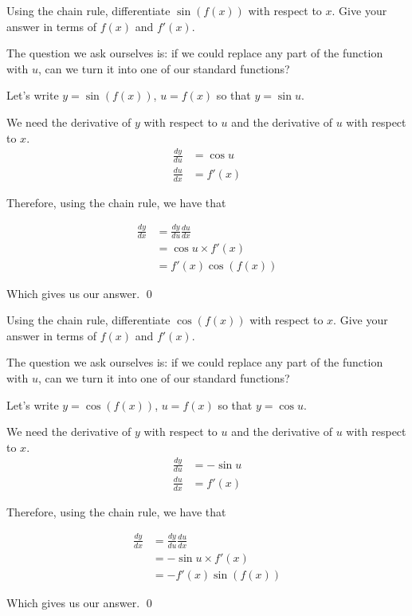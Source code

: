 \begin{example}
    Using the chain rule, differentiate $\sin(f(x))$ with respect to $x$. Give your answer in terms of $f(x)$ and $f'(x)$.
\end{example}
\begin{solution}

    The question we ask ourselves is: if we could replace any part of the function with $u$, can we turn it into one of our standard functions?

    Let's write $y = \sin(f(x))$, $u = f(x)$ so that $y = \sin u$.

    We need the derivative of $y$ with respect to $u$ and the derivative of $u$ with respect to $x$.
    \begin{align*}
        \frac{dy}{du} &= \cos u \tag{using the derivative of $\sin u$} \\
        \frac{du}{dx} &= f'(x) \tag{in terms of $f'(x)$}
    \end{align*}

    Therefore, using the chain rule, we have that 

    \begin{align*}
        \frac{dy}{dx} &= \frac{dy}{du} \frac{du}{dx} \\
         &=  \cos u \times f'(x)  \tag{substituting our workings} \\
         &= f'(x) \cos (f(x)) \tag{using $u = f(x)$}
    \end{align*}

    Which gives us our answer.
    \qed
\end{solution}

\begin{example}
    Using the chain rule, differentiate $\cos(f(x))$ with respect to $x$. Give your answer in terms of $f(x)$ and $f'(x)$.
\end{example}
\begin{solution}

    The question we ask ourselves is: if we could replace any part of the function with $u$, can we turn it into one of our standard functions?

    Let's write $y = \cos(f(x))$, $u = f(x)$ so that $y = \cos u$.

    We need the derivative of $y$ with respect to $u$ and the derivative of $u$ with respect to $x$.
    \begin{align*}
        \frac{dy}{du} &= -\sin u \tag{using the derivative of $\cos u$} \\
        \frac{du}{dx} &= f'(x) \tag{in terms of $f'(x)$}
    \end{align*}

    Therefore, using the chain rule, we have that 

    \begin{align*}
        \frac{dy}{dx} &= \frac{dy}{du} \frac{du}{dx} \\
         &=  -\sin u \times f'(x)  \tag{substituting our workings} \\
         &= -f'(x) \sin (f(x)) \tag{using $u = f(x)$}
    \end{align*}

    Which gives us our answer.
    \qed
\end{solution}

